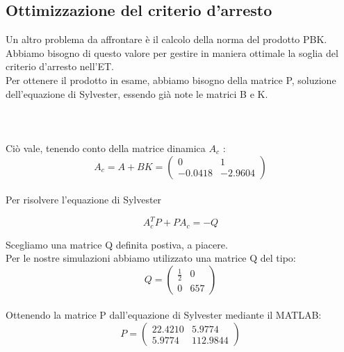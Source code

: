 \documentclass[a4paper,13pt]{article}
\begin{document}
\subsection{Ottimizzazione del criterio d'arresto}
	Un altro problema da affrontare è il calcolo della norma del prodotto PBK.
	Abbiamo bisogno di questo valore per gestire in maniera ottimale la soglia del criterio d'arresto nell'ET.\\
	Per ottenere il prodotto in esame, abbiamo bisogno della matrice P, soluzione dell'equazione di Sylvester, essendo già 	note le matrici B e K.\\ \\ \\ \\
	Ciò vale, tenendo conto della matrice dinamica $A_{c}$ :\\
	
\begin{equation*}
	A_{c}=A+BK=
\begin{pmatrix}

	0&1\\-0.0418&-2.9604

\end{pmatrix}
\end{equation*} \\
	
	Per risolvere l'equazione di Sylvester
	
\begin{equation*}
	A_{c}^{T}P + PA_{c} = -Q              %
\end{equation*}

	Scegliamo una matrice Q definita postiva, a piacere.\\
	Per le nostre simulazioni abbiamo utilizzato una matrice Q del tipo:\\

\begin{equation*}
	Q=
\begin{pmatrix}

	\frac{1}{2}&0\\0&657

\end{pmatrix}
\end{equation*}\\
	
	Ottenendo la matrice P dall'equazione di Sylvester mediante il MATLAB:\\
	
\begin{equation*}
	P=
\begin{pmatrix}

	22.4210&5.9774\\5.9774&112.9844

\end{pmatrix}
\end{equation*}\\
\end{document}
